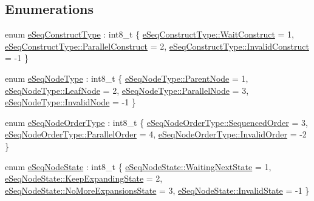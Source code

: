 \subsection*{Enumerations}
\begin{DoxyCompactItemize}
\item 
enum \hyperlink{namespacevt_1_1seq_a3041a01a5db2bccb3183e73b49e78252}{e\+Seq\+Construct\+Type} \+: int8\+\_\+t \{ \hyperlink{namespacevt_1_1seq_a3041a01a5db2bccb3183e73b49e78252ac34b27320b44a81234983aa881c3d60e}{e\+Seq\+Construct\+Type\+::\+Wait\+Construct} = 1, 
\hyperlink{namespacevt_1_1seq_a3041a01a5db2bccb3183e73b49e78252ac5d7fb4472e67ad94349a2bfd6b14dfe}{e\+Seq\+Construct\+Type\+::\+Parallel\+Construct} = 2, 
\hyperlink{namespacevt_1_1seq_a3041a01a5db2bccb3183e73b49e78252a2fd076fec0ebc3801ae240223ee8f989}{e\+Seq\+Construct\+Type\+::\+Invalid\+Construct} = -\/1
 \}
\item 
enum \hyperlink{namespacevt_1_1seq_ae721d4e8b95cf57a7e4169db1929e0f1}{e\+Seq\+Node\+Type} \+: int8\+\_\+t \{ \hyperlink{namespacevt_1_1seq_ae721d4e8b95cf57a7e4169db1929e0f1a829f368b058820f2b291ad9da4ffeb73}{e\+Seq\+Node\+Type\+::\+Parent\+Node} = 1, 
\hyperlink{namespacevt_1_1seq_ae721d4e8b95cf57a7e4169db1929e0f1a267b9f7cb10c41f037e84a25ef20801f}{e\+Seq\+Node\+Type\+::\+Leaf\+Node} = 2, 
\hyperlink{namespacevt_1_1seq_ae721d4e8b95cf57a7e4169db1929e0f1ab93ad8a05dfc00c50baa291e7a808ba6}{e\+Seq\+Node\+Type\+::\+Parallel\+Node} = 3, 
\hyperlink{namespacevt_1_1seq_ae721d4e8b95cf57a7e4169db1929e0f1a8d430d6250b6f558562aace5b6a5a8de}{e\+Seq\+Node\+Type\+::\+Invalid\+Node} = -\/1
 \}
\item 
enum \hyperlink{namespacevt_1_1seq_a313357c71bba2bea5c57f50d69f1edf7}{e\+Seq\+Node\+Order\+Type} \+: int8\+\_\+t \{ \hyperlink{namespacevt_1_1seq_a313357c71bba2bea5c57f50d69f1edf7a6d6423d4f7844da48a87a926492256d3}{e\+Seq\+Node\+Order\+Type\+::\+Sequenced\+Order} = 3, 
\hyperlink{namespacevt_1_1seq_a313357c71bba2bea5c57f50d69f1edf7a6eacb85aebc054ba02a4742b0eac1736}{e\+Seq\+Node\+Order\+Type\+::\+Parallel\+Order} = 4, 
\hyperlink{namespacevt_1_1seq_a313357c71bba2bea5c57f50d69f1edf7abad0e5f1d99f90302a70e1ae24269bb9}{e\+Seq\+Node\+Order\+Type\+::\+Invalid\+Order} = -\/2
 \}
\item 
enum \hyperlink{namespacevt_1_1seq_ad7b0496818667d816e00f717491d3b92}{e\+Seq\+Node\+State} \+: int8\+\_\+t \{ \hyperlink{namespacevt_1_1seq_ad7b0496818667d816e00f717491d3b92a2d046e85576168cdf824c517ac142206}{e\+Seq\+Node\+State\+::\+Waiting\+Next\+State} = 1, 
\hyperlink{namespacevt_1_1seq_ad7b0496818667d816e00f717491d3b92a630c485e3b57db5b6b5589e10476190a}{e\+Seq\+Node\+State\+::\+Keep\+Expanding\+State} = 2, 
\hyperlink{namespacevt_1_1seq_ad7b0496818667d816e00f717491d3b92a9da7cf202a0fae808aa12e7b84d3d2b9}{e\+Seq\+Node\+State\+::\+No\+More\+Expansions\+State} = 3, 
\hyperlink{namespacevt_1_1seq_ad7b0496818667d816e00f717491d3b92aedf260198e4d75d1cb3c7588f7380120}{e\+Seq\+Node\+State\+::\+Invalid\+State} = -\/1
 \}
\end{DoxyCompactItemize}
